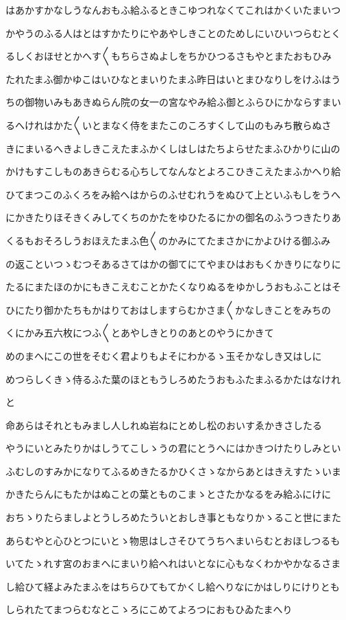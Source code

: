 \documentclass[a4paper,11pt,landscape]{ltjtarticle}
\begin{document}
\par\medskip
はあかすかなしうなんおもふ給ふるときこゆつれなくてこれはかくいたまいつ
\par\medskip
かやうのふる人はとはすかたりにやあやしきことのためしにいひいつらむとく
\par\medskip
るしくおほせとかへす〱もちらさぬよしをちかひつるさもやとまたおもひみ
\par\medskip
たれたまふ御かゆこはいひなとまいりたまふ昨日はいとまひなりしをけふはう
\par\medskip
ちの御物いみもあきぬらん院の女一の宮なやみ給ふ御とふらひにかならすまい
\par\medskip
るへけれはかた〱いとまなく侍をまたこのころすくして山のもみち散らぬさ
\par\medskip
きにまいるへきよしきこえたまふかくしはしはたちよらせたまふひかりに山の
\par\medskip
かけもすこしものあきらむる心ちしてなんなとよろこひきこえたまふかへり給
\par\medskip
ひてまつこのふくろをみ給へはからのふせむれうをぬひて上といふもしをうへ
\par\medskip
にかきたりほそきくみしてくちのかたをゆひたるにかの御名のふうつきたりあ
\par\medskip
くるもおそろしうおほえたまふ色〱のかみにてたまさかにかよひける御ふみ
\par\medskip
の返こといつゝむつそあるさてはかの御てにてやまひはおもくかきりになりに
\par\medskip
たるにまたほのかにもきこえむことかたくなりぬるをゆかしうおもふことはそ
\par\medskip
ひにたり御かたちもかはりておはしますらむかさま〱かなしきことをみちの
\par\medskip
くにかみ五六枚につふ〱とあやしきとりのあとのやうにかきて
\par\medskip
めのまへにこの世をそむく君よりもよそにわかるゝ玉そかなしき又はしに
\par\medskip
めつらしくきゝ侍るふた葉のほともうしろめたうおもふたまふるかたはなけれ
\par\medskip
と
\par\medskip
命あらはそれともみまし人しれぬ岩ねにとめし松のおいすゑかきさしたる
\par\medskip
やうにいとみたりかはしうてこしゝうの君にとうへにはかきつけたりしみとい
\par\medskip
ふむしのすみかになりてふるめきたるかひくさゝなからあとはきえすたゝいま
\par\medskip
かきたらんにもたかはぬことの葉とものこまゝとさたかなるをみ給ふにけに
\par\medskip
おちゝりたらましよとうしろめたういとおしき事ともなりかゝること世にまた
\par\medskip
あらむやと心ひとつにいとゝ物思はしさそひてうちへまいらむとおほしつるも
\par\medskip
いてたゝれす宮のおまへにまいり給へれはいとなに心もなくわかやかなるさま
\par\medskip
し給ひて経よみたまふをはちらひてもてかくし給へりなにかはしりにけりとも
\par\medskip
しられたてまつらむなとこゝろにこめてよろつにおもひゐたまへり
\par\medskip
\end{document}
